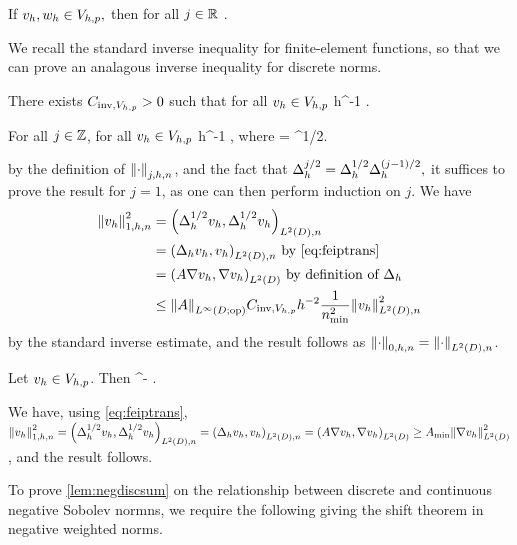 \label{cor:ipdiscbound}
If $v_{h}, w_{h} \in V_{h,p},$ then for all $j \in \mathbb R$
\beqs
\IPLtDn{\vh}{\wh} \leq \Njh{\vh}\Nmjh{\wh}.
\eeqs
\eco

We recall the standard inverse inequality for finite-element functions, so that we can prove an analagous inverse inequality for discrete norms.

\label{lem:inverseinequality}
There exists $C_{\mathrm{inv},V_{h,p}} > 0$ such that for all $v_{h} \in V_{h,p}$
\beqs
\NHoD{\vh} \leq \CinvVhp h^{-1} \NLtD{\vh}.
\eeqs
\ele



\label{lem:inversediscrete}
For all $j \in \mathbb Z$, for all $v_{h} \in V_{h,p}$
\beqs
\Njhn{\vh} \leq \Chinv {} h^{-1} \Njmohn{\vh},
\eeqs
where
\beqs
\Chinv = \CinvVhp {}^{1/2}.
\eeqs
\ele

by the definition of $\Njhn{\cdot}$, and the fact that $\Delta_{h}^{j/2} = \Delta_{h}^{1/2}\Delta_{h}^{(j-1)/2},$ it suffices to prove the result for $j=1$, as one can then perform induction on $j$. We have
\begin{align*}
\Nfn{1,h,n}{\vh}^2 &= \IPLtDn{\Deltahh \vh}{\Deltahh \vh}\\
&= \IPLtDn{\Deltah \vh}{\vh} \text{ by \cref{eq:feiptrans}}\\
&= \IPLtD{A \grad \vh}{\grad \vh} \text{ by definition of } \Deltah\\
&\leq \NLiDop{A} \CinvVhp h^{-2}\frac{1}{\nmin^2} \NLtDn{\vh}^2
\end{align*}
by the standard inverse estimate, and the result follows as $\Nzhn{\cdot} = \NLtDn{\cdot}$.
\epf


\label{lem:h1contdisc}
Let $v_{h} \in V_{h,p}$. Then
\beqs
\SNHoD{\vh} \leq \Amin^{-\half} \Nohn{\vh}.
\eeqs
\ele

We have, using \cref{eq:feiptrans}, $\Nohn{\vh}^2 = \IPLtDn{\Deltahh \vh}{\Deltahh \vh} = \IPLtDn{\Deltah \vh}{\vh}= \IPLtD{A \grad \vh}{\grad \vh} \geq \Amin \NLtD{\grad \vh}^2$, and the result follows.
\epf

To prove \cref{lem:negdiscsum} on the relationship between discrete and continuous negative Sobolev normns, we require the following  giving the shift theorem in negative weighted norms.


